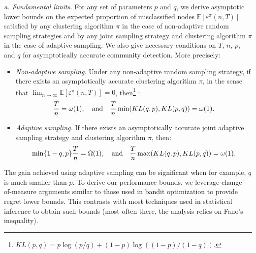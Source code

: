 \documentclass[12pt]{colt}%
\begin{document}
\medskip
\noindent
{\it a. Fundamental limits.} For any set of parameters $p$ and $q$, we derive asymptotic lower bounds on the expected proportion of misclassified nodes $\mathbb{E}[\varepsilon^\pi(n,T)]$ satisfied by any clustering algorithm $\pi$ in the case of non-adaptive random sampling strategies and by any joint sampling strategy and clustering algorithm $\pi$ in the case of adaptive sampling. We also give necessary conditions on $T$, $n$, $p$, and $q$ for asymptotically accurate community detection. More precisely:
\begin{itemize}
\item {\it Non-adaptive sampling.} Under any non-adaptive random sampling strategy, if there exists an asymptotically accurate clustering algorithm $\pi$, in the sense that $\lim_{n\to\infty}\mathbb{E}[\varepsilon^\pi(n,T)]=0$, then\footnote{$KL(p,q)=p\log(p/q)+(1-p)\log((1-p)/(1-q))$.} 
:
\begin{equation}\label{eq:c1}
{T\over n}=\omega(1),\quad\hbox{and}\quad {T\over n}\min(KL(q,p),KL(p,q))=\omega(1).
\end{equation}
\item {\it Adaptive sampling.} If there exists an asymptotically accurate joint adaptive sampling strategy and clustering algorithm $\pi$, then:
\begin{equation}\label{eq:c2}
\min\{1-q, p \}{T\over n}=\Omega(1),\quad\hbox{and}\quad {T\over n}\max(KL(q,p),KL(p,q))=\omega(1).
\end{equation}
\end{itemize}
The gain achieved using adaptive sampling can be significant when for example, $q$ is much smaller than $p$. To derive our performance bounds, we leverage change-of-measure arguments similar to those used in bandit optimization to provide regret lower bounds. This contrasts with most techniques used in statistical inference to obtain such bounds  (most often there, the analysis relies on Fano's inequality).
\end{document}
